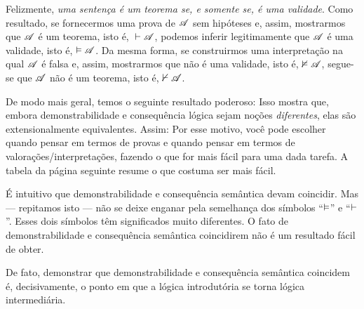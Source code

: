 Felizmente, \emph{uma sentença é um teorema se, e somente se, é uma validade}. Como resultado, se fornecermos uma prova de $\mathscr{A}$ sem hipóteses e, assim, mostrarmos que $\mathscr{A}$ é um teorema, isto é, ${}\vdash \mathscr{A}$, podemos inferir legitimamente que $\mathscr{A}$ é uma validade, isto é, $\vDash\mathscr{A}$. Da mesma forma, se construirmos uma interpretação na qual $\mathscr{A}$ é falsa e, assim, mostrarmos que não é uma validade, isto é, $\nvDash \mathscr{A}$, segue-se que $\mathscr{A}$ não é um teorema, isto é, $\nvdash \mathscr{A}$.

De modo mais geral, temos o seguinte resultado poderoso:
Isso mostra que, embora demonstrabilidade e consequência lógica sejam noções \emph{diferentes}, elas são extensionalmente equivalentes. Assim:
Por esse motivo, você pode escolher quando pensar em termos de provas e quando pensar em termos de valorações/interpretações, fazendo o que for mais fácil para uma dada tarefa. A tabela da página seguinte resume o que costuma ser mais fácil.

É intuitivo que demonstrabilidade e consequência semântica devam coincidir. Mas — repitamos isto — não se deixe enganar pela semelhança dos símbolos \textquotedblleft $\vDash$\textquotedblright{} e \textquotedblleft $\vdash$\textquotedblright{}. Esses dois símbolos têm significados muito diferentes. O fato de demonstrabilidade e consequência semântica coincidirem não é um resultado fácil de obter.

De fato, demonstrar que demonstrabilidade e consequência semântica coincidem é, decisivamente, o ponto em que a lógica introdutória se torna lógica intermediária.

